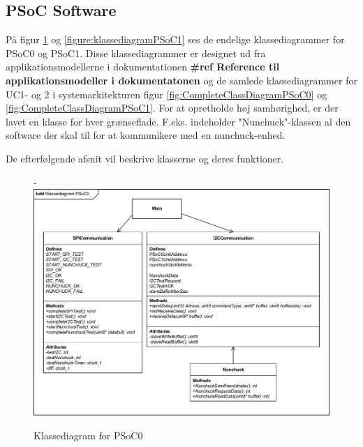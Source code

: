 \subsection{PSoC Software}
På figur \ref{figure:klassediagramPSoC0} og \ref{figure:klassediagramPSoC1} ses de endelige klassediagrammer for PSoC0 og PSoC1. Disse klassediagrammer er designet ud fra applikationsmodellerne i dokumentationen \textbf{\#ref Reference til applikationsmodeller i dokumentatonen} og de samlede klassediagrammer for UC1- og 2 i systemarkitekturen figur \ref{fig:CompleteClassDiagramPSoC0} og \ref{fig:CompleteClassDiagramPSoC1}. For at opretholde høj samhørighed, er der lavet en klasse for hver grænseflade. F.eks. indeholder "Nunchuck"-klassen al den software der skal til for at kommunikere med en nunchuck-enhed. 

De efterfølgende afsnit vil beskrive klasserne og deres funktioner.

\begin{figure}[H]
	\begin{adjustwidth}{-2cm}{-\rightmargin}
		\centering
		\includegraphics[width=1.35\textwidth]{DesignOgImplementering/images/PSoC0KlassediagramOversigt.pdf}
		\caption{Klassediagram for PSoC0}
		\label{figure:klassediagramPSoC0}
	\end{adjustwidth}
\end{figure}

